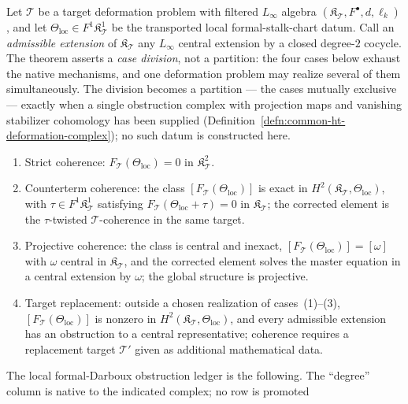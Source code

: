 \begin{thm}\label{thm:four-curvature-taxonomy}\label{thm:obstruction-twist-dichotomy}
Let \(\mathcal T\) be a target deformation problem with filtered
\(L_\infty\) algebra
\((\mathfrak K_{\mathcal T},F^\bullet,d,\ell_k)\), and let
\(\Theta_{\mathrm{loc}}\in F^1\mathfrak K_{\mathcal T}^1\) be the
transported local formal-stalk-chart datum.  Call an
\emph{admissible extension} of \(\mathfrak K_{\mathcal T}\) any
\(L_\infty\) central extension by a closed degree-\(2\) cocycle.
The theorem asserts a \emph{case division}, not a partition: the four
cases below exhaust the native mechanisms, and one deformation problem
may realize several of them simultaneously.  The division becomes a
partition --- the cases mutually exclusive --- exactly when a single
obstruction complex with projection maps and vanishing stabilizer
cohomology has been supplied
(Definition~\ref{defn:common-ht-deformation-complex}); no such datum
is constructed here.
\begin{enumerate}
\item Strict coherence: \(F_{\mathcal T}(\Theta_{\mathrm{loc}})=0\)
in \(\mathfrak K_{\mathcal T}^2\).
\item Counterterm coherence: the class
\([F_{\mathcal T}(\Theta_{\mathrm{loc}})]\) is exact in
\(H^2(\mathfrak K_{\mathcal T},\Theta_{\mathrm{loc}})\), with
\(\tau\in F^1\mathfrak K_{\mathcal T}^1\) satisfying
\(F_{\mathcal T}(\Theta_{\mathrm{loc}}+\tau)=0\) in
\(\mathfrak K_{\mathcal T}\); the corrected element is the
\(\tau\)-twisted \(\mathcal T\)-coherence in the same target.
\item Projective coherence: the class is central and inexact,
\([F_{\mathcal T}(\Theta_{\mathrm{loc}})]=[\omega]\) with \(\omega\)
central in \(\mathfrak K_{\mathcal T}\), and the corrected element
solves the master equation in a central extension by \(\omega\); the
global structure is projective.
\item Target replacement: outside a chosen realization of cases~(1)--(3),
\([F_{\mathcal T}(\Theta_{\mathrm{loc}})]\) is nonzero in
\(H^2(\mathfrak K_{\mathcal T},\Theta_{\mathrm{loc}})\), and every
admissible extension has an obstruction to a central representative; coherence
requires a replacement target
\(\mathcal T'\) given as additional mathematical data.
\end{enumerate}
The local formal-Darboux obstruction ledger is the following.  The
``degree'' column is native to the indicated complex; no row is promoted

\end{thm}
